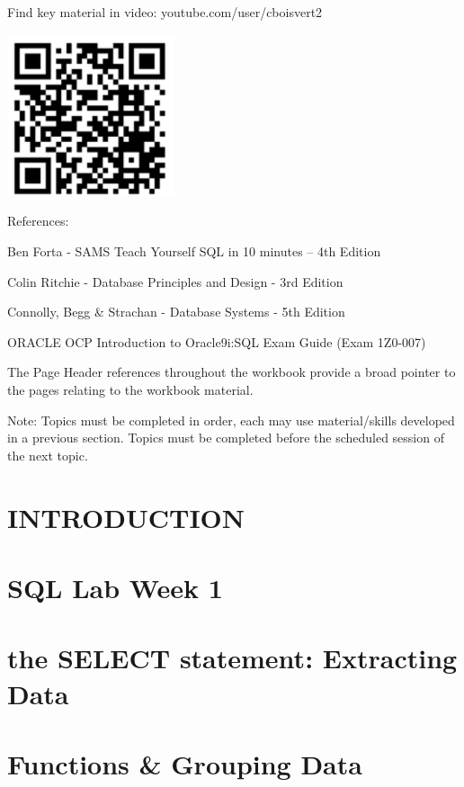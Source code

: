 \documentclass{article}
\begin{document}
\begin{center}
\begin{minipage}{6.525cm}
Find key material in video: youtube.com/user/cboisvert2

\includegraphics[width=4.911cm,height=4.77cm]{images/img (1).png}
 
\end{minipage}
\end{center}
\clearpage
References:

Ben Forta - SAMS Teach Yourself SQL in 10 minutes -- 4th Edition

Colin Ritchie - Database Principles and Design - 3rd Edition

Connolly, Begg \& Strachan - Database Systems  {}-  5th Edition

ORACLE OCP Introduction to Oracle9i:SQL Exam Guide (Exam 1Z0-007) 

The Page Header references throughout the workbook provide a broad pointer to the pages relating to the workbook material.

Note: Topics must be completed in order, each may use material/skills developed in a previous section.  Topics must be completed before the scheduled session of the next topic.

\clearpage
\section{INTRODUCTION}


\section{SQL Lab Week 1}


\section{the SELECT statement: Extracting Data}


\section{Functions \& Grouping Data}

\end{document}
